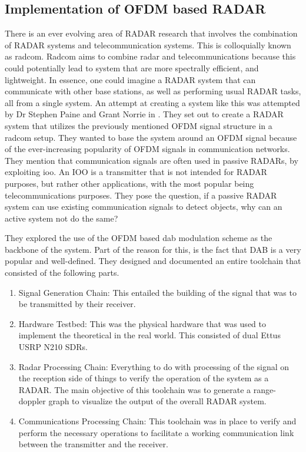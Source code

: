\documentclass[11pt]{report}
\begin{document}
\subsection{Implementation of OFDM based RADAR}
There is an ever evolving area of RADAR research that involves the combination of RADAR systems and telecommunication systems. This is colloquially known as \gls{radcom}. Radcom aims to combine radar and telecommunications because this could potentially lead to system that are more spectrally efficient, and lightweight. In essence, one could imagine a RADAR system that can communicate with other base stations, as well as performing usual RADAR tasks, all from a single system. An attempt at creating a system like this was attempted by Dr Stephen Paine and Grant Norrie in \cite{Design_and_Demonstration_of_an_OFDM_Based_RadCom_System}. They set out to create a RADAR system that utilizes the previously mentioned OFDM signal structure in a radcom setup. They wanted to base the system around an OFDM signal because of the ever-increasing popularity of OFDM signals in communication networks. They mention that communication signals are often used in passive RADARs, by exploiting \gls{ioo}. An IOO is a transmitter that is not intended for RADAR purposes, but rather other applications, with the most popular being telecommunications purposes. They pose the question, if a passive RADAR system can use existing communication signals to detect objects, why can an active system not do the same?

They explored the use of the OFDM based \gls{dab} modulation scheme as the backbone of the system. Part of the reason for this, is the fact that DAB is a very popular and well-defined. They designed and documented an entire toolchain that consisted of the following parts.

\begin{enumerate}
    \item Signal Generation Chain: This entailed the building of the signal that was to be transmitted by their receiver.
    \item Hardware Testbed: This was the physical hardware that was used to implement the theoretical in the real world. This consisted of dual Ettus USRP N210 SDRs.
    \item Radar Processing Chain: Everything to do with processing of the signal on the reception side of things to verify the operation of the system as a RADAR. The main objective of this toolchain was to generate a range-doppler graph to visualize the output of the overall RADAR system.
    \item Communications Processing Chain: This toolchain was in place to verify and perform the necessary operations to facilitate a working communication link between the transmitter and the receiver.
\end{enumerate}
\end{document}
